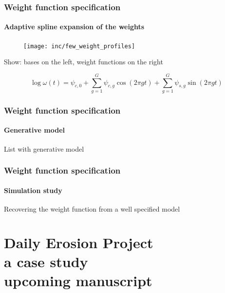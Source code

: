 \documentclass{snedecorbeamer}
\begin{document}
\begin{frame}
  \frametitle{Weight function specification}
  \framesubtitle{Adaptive spline expansion of the weights}

  \begin{figure}
    \centering
    \texttt{[image: inc/few\_weight\_profiles]}
  \end{figure}

  Show: bases on the left, weight functions on the right

  \begin{equation}
    \log\omega(t)
    \label{eq:few-log}
    =\psi_{c,0} + \sum_{g = 1}^{G} \psi_{c,g}\cos\left(2\pi gt\right)
      + \sum_{g = 1}^{G} \psi_{s,g}\sin\left(2\pi gt\right)
  \end{equation}

\end{frame}

\begin{frame}
  \frametitle{Weight function specification}
  \framesubtitle{Generative model}

  List with generative model
\end{frame}

\begin{frame}
  \frametitle{Weight function specification}
  \framesubtitle{Simulation study}

  Recovering the weight function from a well specified model
\end{frame}

\section{Daily Erosion Project \\ {\small a case study} \\
{\tiny upcoming manuscript}}
\end{document}
